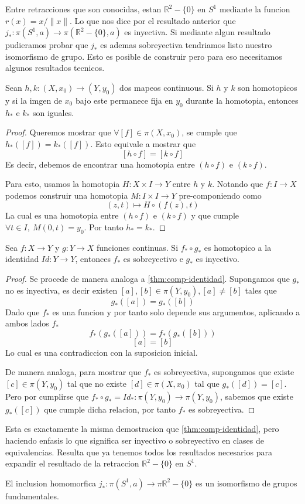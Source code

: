 Entre retracciones que son conocidas, estan \(\mathbb R ^2 - \{0\}\) en
\(S^1\) mediante la funcion \(r (x) = x / \lVert x \rVert \). Lo que nos
dice por el resultado anterior que \(j_{*} : \pi (S^1, a) \to \pi
(\mathbb R ^2 - \{0\}, a)\) es inyectiva. Si mediante algun resultado
pudieramos probar que \(j_{*}\) es ademas sobreyectiva tendriamos listo
nuestro isomorfismo de grupo. Esto es posible de construir pero para eso
necesitamos algunos resultados tecnicos.

\begin{lema}
  Sean \(h,k : (X, x_0) \to (Y, y_0)\) dos mapeos continuous. Si \(h\) y
  \(k\) son homotopicos y si la imgen de \(x_0\) bajo este permanece
  fija en \(y_0\) durante la homotopia, entonces \(h_*\) e \(k_*\) son iguales.
\end{lema}
\begin{proof}
  Queremos mostrar que \(\forall [f] \in \pi (X,x_0)\), se cumple que
  \(h_* ([f]) = k_* ([f])\). Esto equivale a mostrar que
  \[ [h \circ f] = [k \circ f] \]
  Es decir, debemos de encontrar una homotopia entre \((h \circ f)\) e \(
  (k \circ f)\).

  Para esto, usamos la homotopia \(H : X \times I \to Y \) entre \(h\) y
  \(k\). Notando que \(f : I \to X\) podemos construir una homotopia \(M
  : I \times I \to Y \) pre-componiendo como
  \[ (z, t) \mapsto H \circ (f(z), t) \]
  La cual es una homotopia entre \((h \circ f)\) e \((k \circ f)\) y que
  cumple \( \forall t \in I,\ M (0, t) = y_0\). Por tanto \(h_* = k_*\).
\end{proof}
\begin{lema}
  Sea \(f : X \to Y\) y \(g : Y \to X\) funciones continuas. Si \(f_*
  \circ g_*\) es homotopico a la identidad \( Id : Y \to Y\), entonces
  \(f_*\) es sobreyectivo e \(g_*\) es inyectivo.
\end{lema}
\begin{proof}
  Se procede de manera analoga a \ref{thm:comp-identidad}. Supongamos
  que \(g_*\) no es inyectiva, es decir existen \([a],[b] \in \pi
  (Y,y_0), [a] \neq [b]\) tales que
  \[ g_* ([a]) = g_* ([b]) \]
  Dado que \(f_*\) es una funcion y por tanto solo depende sus
  argumentos, aplicando a ambos lados \(f_*\)
  \[ f_* (g_* ([a])) = f_* (g_* ([b])) \]
  \[ [a] = [b] \]
  Lo cual es una contradiccion con la suposicion inicial.

  De manera analoga, para mostrar que \(f_*\) es sobreyectiva,
  supongamos que existe \([c] \in \pi (Y, y_0)\) tal que no existe \([d]
  \in \pi (X,x_0)\) tal que \(g_* ([d]) = [c]\). Pero por cumplirse que
  \( f_* \circ g_* = Id_* : \pi (Y, y_0) \to \pi (Y, y_0)\), sabemos que
  existe \(g_* ([c])\) que cumple dicha relacion, por tanto \(f_*\) es
  sobreyectiva.
\end{proof}
Esta es exactamente la misma demostracion que \ref{thm:comp-identidad},
pero haciendo enfasis lo que significa ser inyectivo o sobreyectivo en
clases de equivalencias. Resulta que ya tenemos todos los resultados
necesarios para expandir el resultado de la retraccion \(\mathbb R ^2 -
\{0\}\) en \(S^1\).

\begin{teorema}
  El inclusion homomorfica \(j_* : \pi (S^1, a) \to \pi \mathbb R ^2 -
  \{0\}\) es un isomorfismo de grupos fundamentales.
\end{teorema}